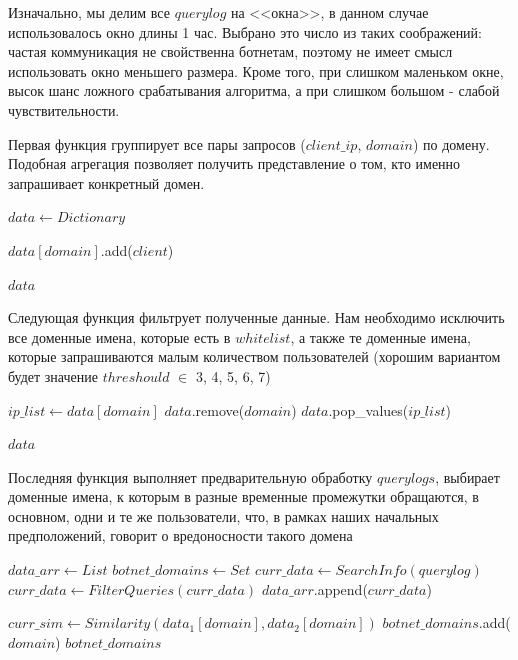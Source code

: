 \documentclass[a4paper,14pt]{extreport} %
\begin{document}
Изначально, мы делим все $querylog$ на <<окна>>, в данном случае использовалось окно длины 1 час. Выбрано это число из таких соображений: частая коммуникация не свойственна ботнетам, поэтому не имеет смысл использовать окно меньшего размера. Кроме того, при слишком маленьком окне, высок шанс ложного срабатывания алгоритма, а при слишком большом - слабой чувствительности.
	
Первая функция группирует все пары запросов ($client\_ip$, $domain$) по домену. Подобная агрегация позволяет получить представление о том, кто именно запрашивает конкретный домен.
\begin{algorithmic}
	\State $data\gets Dictionary$
			
	\State $data[domain]$.add($client$)
	\EndFor
			
	\State \Return $data$
	\EndFunction
\end{algorithmic}

Следующая функция фильтрует полученные данные. Нам необходимо исключить все доменные имена, которые есть в $whitelist$, а также те доменные имена, которые запрашиваются малым количеством пользователей (хорошим вариантом будет значение $threshould$ $\in$ 3, 4, 5, 6, 7)
	

\begin{algorithmic}
	\State $ip\_list\gets data[domain]$
	\State $data$.remove($domain$)
	\State $data$.pop\_values($ip\_list$)
	\EndIf
				
				
	\EndFor
	\State \Return $data$
	\EndFunction
\end{algorithmic}
	
Последняя функция выполняет предварительную обработку $querylogs$, выбирает доменные имена, к которым в разные временные промежутки обращаются, в основном, одни и те же пользователи, что, в рамках наших начальных предположений, говорит о вредоносности такого домена
\begin{algorithmic}
	\State $data\_arr\gets List$
	\State $botnet\_domains\gets Set$
	\State $curr\_data\gets SearchInfo(querylog)$
	\State $curr\_data\gets FilterQueries(curr\_data)$
	\State $data\_arr$.append($curr\_data$)
		
	\EndFor
	\State $curr\_sim\gets Similarity(data_1[domain], data_2[domain])$
	\State $botnet\_domains$.add($domain$)
	\EndIf
	\EndFor
	\EndIf
	\EndFor
	\EndFor
	\State \Return $botnet\_domains$
	\EndFunction
\end{algorithmic}
	
\end{document}
